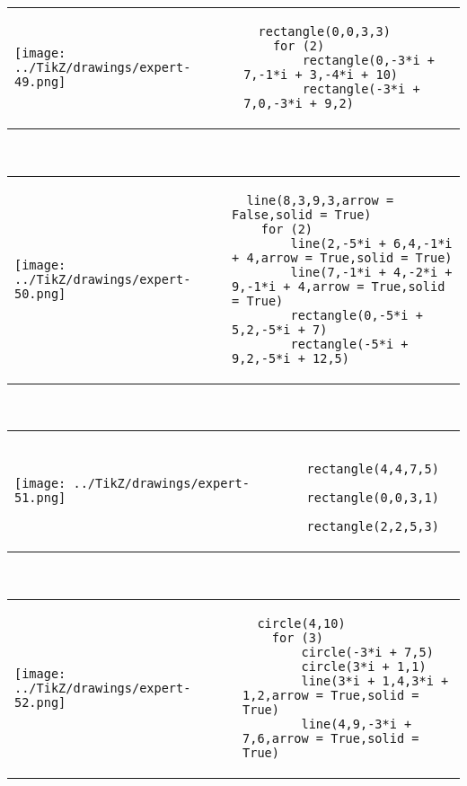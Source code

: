             \begin{tabular}{ll}
    \texttt{[image: ../TikZ/drawings/expert-49.png]}&
    
        \begin{minipage}{10cm}
        \begin{verbatim}
  rectangle(0,0,3,3)
    for (2)
        rectangle(0,-3*i + 7,-1*i + 3,-4*i + 10)
        rectangle(-3*i + 7,0,-3*i + 9,2)
        \end{verbatim}
\end{minipage}

    \end{tabular}        
            \\

            \begin{tabular}{ll}
    \texttt{[image: ../TikZ/drawings/expert-50.png]}&
    
        \begin{minipage}{10cm}
        \begin{verbatim}
  line(8,3,9,3,arrow = False,solid = True)
    for (2)
        line(2,-5*i + 6,4,-1*i + 4,arrow = True,solid = True)
        line(7,-1*i + 4,-2*i + 9,-1*i + 4,arrow = True,solid = True)
        rectangle(0,-5*i + 5,2,-5*i + 7)
        rectangle(-5*i + 9,2,-5*i + 12,5)
        \end{verbatim}
\end{minipage}

    \end{tabular}        
            \\

            \begin{tabular}{ll}
    \texttt{[image: ../TikZ/drawings/expert-51.png]}&
    
        \begin{minipage}{10cm}
        \begin{verbatim}
  rectangle(4,4,7,5)
  rectangle(0,0,3,1)
  rectangle(2,2,5,3)
        \end{verbatim}
\end{minipage}

    \end{tabular}        
            \\

            \begin{tabular}{ll}
    \texttt{[image: ../TikZ/drawings/expert-52.png]}&
    
        \begin{minipage}{10cm}
        \begin{verbatim}
  circle(4,10)
    for (3)
        circle(-3*i + 7,5)
        circle(3*i + 1,1)
        line(3*i + 1,4,3*i + 1,2,arrow = True,solid = True)
        line(4,9,-3*i + 7,6,arrow = True,solid = True)
        \end{verbatim}
\end{minipage}

    \end{tabular}        
            \\

